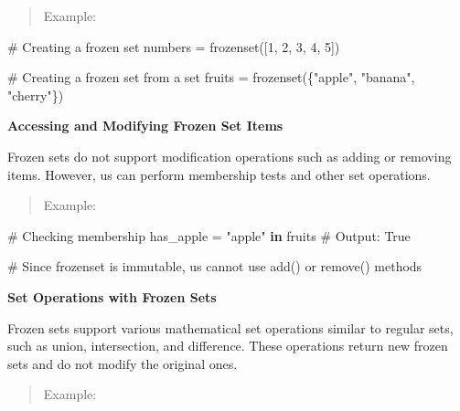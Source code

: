 \documentclass[
  letterpaper,
  DIV=11,
  numbers=noendperiod]{scrreprt}
\newenvironment{Shaded}{\begin{snugshade}}{\end{snugshade}}
\newcommand{\BuiltInTok}[1]{\textcolor[rgb]{0.00,0.23,0.31}{#1}}
\newcommand{\CommentTok}[1]{\textcolor[rgb]{0.37,0.37,0.37}{#1}}
\newcommand{\DecValTok}[1]{\textcolor[rgb]{0.68,0.00,0.00}{#1}}
\newcommand{\KeywordTok}[1]{\textcolor[rgb]{0.00,0.23,0.31}{\textbf{#1}}}
\newcommand{\NormalTok}[1]{\textcolor[rgb]{0.00,0.23,0.31}{#1}}
\newcommand{\OperatorTok}[1]{\textcolor[rgb]{0.37,0.37,0.37}{#1}}
\newcommand{\StringTok}[1]{\textcolor[rgb]{0.13,0.47,0.30}{#1}}
\theoremstyle{plain}
\theoremstyle{definition}
\theoremstyle{remark}
\begin{document}
\begin{quote}
Example:
\end{quote}

\begin{Shaded}
\begin{Highlighting}[]
\CommentTok{\# Creating a frozen set}
\NormalTok{numbers }\OperatorTok{=} \BuiltInTok{frozenset}\NormalTok{([}\DecValTok{1}\NormalTok{, }\DecValTok{2}\NormalTok{, }\DecValTok{3}\NormalTok{, }\DecValTok{4}\NormalTok{, }\DecValTok{5}\NormalTok{])}

\CommentTok{\# Creating a frozen set from a set}
\NormalTok{fruits }\OperatorTok{=} \BuiltInTok{frozenset}\NormalTok{(\{}\StringTok{"apple"}\NormalTok{, }\StringTok{"banana"}\NormalTok{, }\StringTok{"cherry"}\NormalTok{\})}
\end{Highlighting}
\end{Shaded}

\textbf{Accessing and Modifying Frozen Set Items}

Frozen sets do not support modification operations such as adding or
removing items. However, us can perform membership tests and other set
operations.

\begin{quote}
Example:
\end{quote}

\begin{Shaded}
\begin{Highlighting}[]
\CommentTok{\# Checking membership}
\NormalTok{has\_apple }\OperatorTok{=} \StringTok{"apple"} \KeywordTok{in}\NormalTok{ fruits  }\CommentTok{\# Output: True}

\CommentTok{\# Since frozenset is immutable, us cannot use add() or remove() methods}
\end{Highlighting}
\end{Shaded}

\textbf{Set Operations with Frozen Sets}

Frozen sets support various mathematical set operations similar to
regular sets, such as union, intersection, and difference. These
operations return new frozen sets and do not modify the original ones.

\begin{quote}
Example:
\end{quote}
\end{document}
